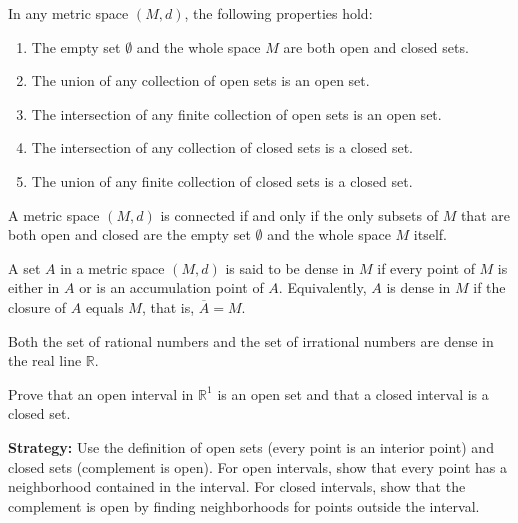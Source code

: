 \begin{theorem}
In any metric space $(M,d)$, the following properties hold:
\begin{enumerate}
\item The empty set $\emptyset$ and the whole space $M$ are both open and closed sets.
\item The union of any collection of open sets is an open set.
\item The intersection of any finite collection of open sets is an open set.
\item The intersection of any collection of closed sets is a closed set.
\item The union of any finite collection of closed sets is a closed set.
\end{enumerate}
\end{theorem}

\begin{theorem}
A metric space $(M,d)$ is connected if and only if the only subsets of $M$ that are both open and closed are the empty set $\emptyset$ and the whole space $M$ itself.
\end{theorem}

\begin{definition}
A set $A$ in a metric space $(M,d)$ is said to be dense in $M$ if every point of $M$ is either in $A$ or is an accumulation point of $A$. Equivalently, $A$ is dense in $M$ if the closure of $A$ equals $M$, that is, $\overline{A} = M$.
\end{definition}

\begin{theorem}
Both the set of rational numbers and the set of irrational numbers are dense in the real line $\mathbb{R}$.
\end{theorem}



\begin{problembox}
\begin{problemstatement}
Prove that an open interval in $\mathbb{R}^1$ is an open set and that a closed interval is a closed set.
\end{problemstatement}
\end{problembox}

\noindent\textbf{Strategy:} Use the definition of open sets (every point is an interior point) and closed sets (complement is open). For open intervals, show that every point has a neighborhood contained in the interval. For closed intervals, show that the complement is open by finding neighborhoods for points outside the interval.


